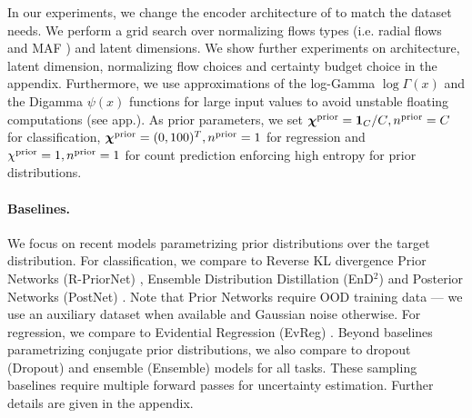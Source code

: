 In our experiments, we change the encoder architecture of \NatPNacro{} to match the dataset needs. We perform a grid search over normalizing flows types (i.e. radial flows \citep{radialflow} and MAF \citep{made,maf}) and latent dimensions. We show further experiments on architecture, latent dimension, normalizing flow choices and certainty budget choice in the appendix. Furthermore, we use approximations of the log-Gamma $\log\Gamma(x)$ and the Digamma $\psi(x)$ functions for large input values to avoid unstable floating computations (see app.). As prior parameters, we set ${\bm{\chi}^\text{prior}=\bm{1}_{C}/C}, {n^\text{prior}=C}$ for classification, ${\bm{\chi}^\text{prior}=(0, 100)^T}, n^\text{prior}=1$ for regression and $\chi^\text{prior}=1, n^\text{prior}=1$ for count prediction enforcing high entropy for prior distributions.

\paragraph{Baselines.} We focus on recent models parametrizing prior distributions over the target distribution. For classification, we compare \NatPNacro{} to Reverse KL divergence Prior Networks (R-PriorNet) \citep{reverse-kl}, Ensemble Distribution Distillation (EnD$^2$) \citep{distribution-distillation} and Posterior Networks (PostNet) \citep{charpentier2020}. Note that Prior Networks require OOD training data --- we use an auxiliary dataset when available and Gaussian noise otherwise. For regression, we compare to Evidential Regression (EvReg) \citep{evidential-regression}. Beyond baselines parametrizing conjugate prior distributions, we also compare to dropout (Dropout) \citep{dropout} and ensemble (Ensemble) \citep{ensembles} models for all tasks. These sampling baselines require multiple forward passes for uncertainty estimation. 
Further details are given in the appendix.


